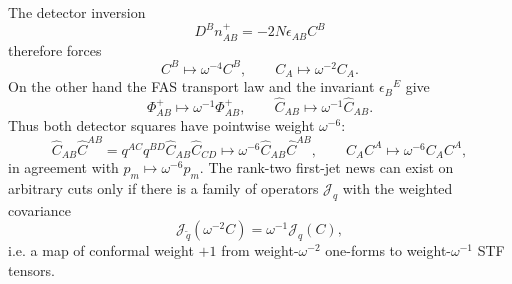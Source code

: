 \documentclass[11pt,a4paper]{article}
\begin{document}
The detector inversion
\begin{equation}\label{eq:detector-weight-div}
  D^Bn^+_{AB}=-2N\epsilon_{AB}C^B
\end{equation}
therefore forces
\begin{equation}\label{eq:detector-weights}
  C^B\mapsto \omega^{-4}C^B,
  \qquad
  C_A\mapsto \omega^{-2}C_A .
\end{equation}
On the other hand the FAS transport law and the invariant \(\epsilon_B{}^E\) give
\begin{equation}\label{eq:flux-weight}
  \Phi^+_{AB}\mapsto\omega^{-1}\Phi^+_{AB},
  \qquad
  \hat C_{AB}\mapsto\omega^{-1}\hat C_{AB}.
\end{equation}
Thus both detector squares have pointwise weight \(\omega^{-6}\):
\begin{equation}\label{eq:detector-square-weights}
  \hat C_{AB}\hat C^{AB}
  =
  q^{AC}q^{BD}\hat C_{AB}\hat C_{CD}
  \mapsto\omega^{-6}\hat C_{AB}\hat C^{AB},
  \qquad
  C_AC^A\mapsto\omega^{-6}C_AC^A,
\end{equation}
in agreement with \(p_m\mapsto\omega^{-6}p_m\).  The rank-two first-jet news can exist on arbitrary cuts only if there is a family of operators \(\mathcal J_q\) with the weighted covariance
\begin{equation}\label{eq:J-required-weight}
  \mathcal J_{\tilde q}(\omega^{-2}C)
  =
  \omega^{-1}\mathcal J_q(C),
\end{equation}
i.e. a map of conformal weight \(+1\) from weight-\(\omega^{-2}\) one-forms to weight-\(\omega^{-1}\) STF tensors.
\end{document}
